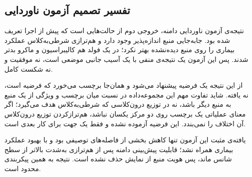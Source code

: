 \subsection{تفسیر تصمیم آزمون ناوردایی}

نتیجه‌ی آزمون ناوردایی دامنه، خروجی دوم از حالت‌هایی است که پیش از اجرا تعریف شده بود. جابه‌جایی منبع اندازه‌پذیر وجود دارد و هم‌ترازی شرطی‌به‌کلاس عملکرد بیماری را روی منبع دیده‌نشده بهتر نکرد؛ در یک فولد هم کالیبراسیون و  ماکرو بدتر شدند. پس این آزمون یک نتیجه‌ی منفی با یک آسیب جانبی موضعی است، نه موفقیت و نه شکست کامل.

از این نتیجه یک فرضیه پیشنهاد می‌شود و همان‌جا برچسب می‌خورد که فرضیه است، نه یافته. شاید تفاوت مهم این مجموعه‌داده در نسبت میان برچسب و ویژگی از یک منبع به منبع دیگر باشد، نه در توزیع درون‌کلاسی که  شرطی‌به‌کلاس هدف می‌گیرد؛ اگر معنای عملیاتی یک برچسب روی دو مرکز یکسان نباشد، هم‌ترازکردن توزیع درون‌کلاس آن اختلاف را نمی‌بندد. این فرضیه آزموده نشده و فقط یک جهت برای کار بعدی است.

یافته‌ی مثبت این آزمون تنها کاهش بخشی از فاصله‌های توصیفی بود و با بهبود عملکرد بیماری همراه نشد؛ قابلیت پیش‌بینی دامنه پس از هم‌ترازی به‌شدت بالاتر از سطح شانس ماند، پس هویت منبع از نمایش حذف نشده است. نتیجه به همین پیکربندی محدود است.
